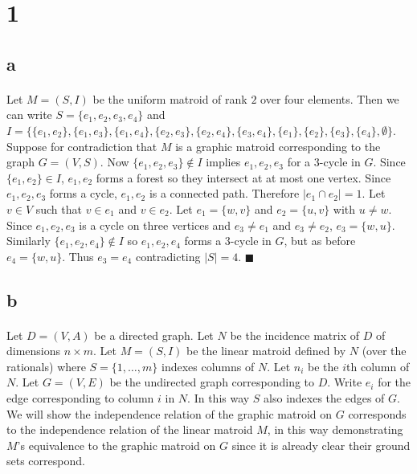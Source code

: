 \documentclass[letterpaper,12pt,oneside,onecolumn]{report}
\begin{document}
\section*{1}
\subsection*{a}
\paragraph{}
Let $M = (S,I)$ be the uniform matroid of rank $2$ over four elements. Then we can write $S = \{e_1, e_2, e_3, e_4\}$ and $I = \{\{e_1, e_2\}, \{e_1, e_3\}, \{e_1,e_4\},\{e_2,e_3\}, \{e_2,e_4\}, \{e_3,e_4\}, \{e_1\}, \{e_2\}, \{e_3\}, \{e_4\}, \emptyset\}$. Suppose for contradiction that $M$ is a graphic matroid corresponding to the graph $G = (V, S)$. Now $\{e_1,e_2,e_3\} \not\in I$ implies $e_1, e_2,e_3$ for a $3$-cycle in $G$. Since $\{e_1, e_2\} \in I$, $e_1,e_2$ forms a forest so they intersect at at most one vertex. Since $e_1,e_2,e_3$ forms a cycle, $e_1,e_2$ is a connected path. Therefore $|e_1 \cap e_2| = 1$. Let $v \in V$ such that $v \in e_1$ and $v \in e_2$. Let $e_1 = \{w,v\}$ and $e_2 = \{u,v\}$ with $u \neq w$. Since $e_1,e_2,e_3$ is a cycle on three vertices and $e_3 \neq e_1$ and $e_3 \neq e_2$, $e_3 = \{w,u\}$. Similarly $\{e_1,e_2,e_4\} \not\in I$ so $e_1,e_2,e_4$ forms a $3$-cycle in $G$, but as before $e_4 = \{w,u\}$. Thus $e_3 = e_4$ contradicting $|S| = 4$. $\blacksquare$
\subsection*{b}
\paragraph{}
Let $D = (V,A)$ be a directed graph. Let $N$ be the incidence matrix of $D$ of dimensions $n \times m.$ Let $M = (S,I)$ be the linear matroid defined by $N$ (over the rationals) where $S = \{1, \dots, m\}$ indexes columns of $N$. Let $n_i$ be the $i$th column of $N$. Let $G = (V,E)$ be the undirected graph corresponding to $D$. Write $e_i$ for the edge corresponding to column $i$ in $N$. In this way $S$ also indexes the edges of $G$. We will show the independence relation of the graphic matroid on $G$ corresponds to the independence relation of the linear matroid $M$, in this way demonstrating $M$'s equivalence to the graphic matroid on $G$ since it is already clear their ground sets correspond.
\end{document}
